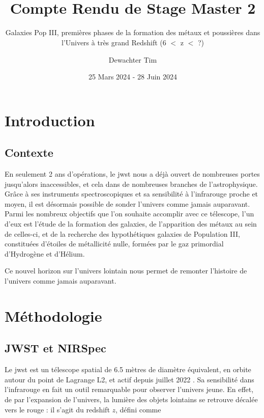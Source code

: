 \documentclass[11pt, a4paper]{article}
\title{\textbf{ \\{\Huge Compte Rendu de Stage Master 2}}}
\subtitle{Galaxies Pop III, premières phases de la formation des métaux et poussières dans l'Univers à très grand Redshift (6 $<$ z $<$ ?)}
\author{Dewachter Tim}
\date{25 Mars 2024 - 28 Juin 2024}
\begin{document}
\maketitle

\newpage

\tableofcontents

\newpage

\section{Introduction}


\subsection{Contexte}

En seulement 2 ans d'opérations, le \gls{jwst} nous a déjà ouvert de nombreuses portes jusqu'alors inaccessibles, et cela dans de nombreuses branches de l'astrophysique. Grâce à ses instruments spectroscopiques et sa sensibilité à l'infrarouge proche et moyen, il est désormais possible de sonder l'univers comme jamais auparavant. Parmi les nombreux objectifs que l'on souhaite accomplir avec ce télescope, l'un d'eux est l'étude de la formation des galaxies, de l'apparition des métaux au sein de celles-ci, et de la recherche des hypothétiques galaxies de Population III, constituées d'étoiles de métallicité nulle, formées par le gaz primordial d'Hydrogène et d'Hélium.

Ce nouvel horizon sur l'univers lointain nous permet de remonter l'histoire de l'univers comme jamais auparavant. \cite{2023arXiv230600953M} %



\section{Méthodologie}

\subsection{JWST et NIRSpec}

Le \gls{jwst} est un télescope spatial de 6.5 mètres de diamètre équivalent, en orbite autour du point de Lagrange L2, et actif depuis juillet 2022 \cite{jwst_website}. Sa sensibilité dans l'infrarouge en fait un outil remarquable pour observer l'univers jeune. En effet, de par l'expansion de l'univers, la lumière des objets lointains se retrouve décalée vers le rouge : il s'agit du redshift $z$, défini comme 
\end{document}
